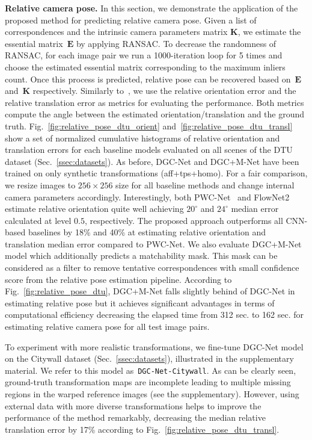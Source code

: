 \documentclass[10pt,twocolumn,letterpaper]{article}
\begin{document}
\noindent\textbf{Relative camera pose.} In this section, we demonstrate the application of the proposed method for predicting relative camera pose. Given a list of correspondences and the intrinsic camera parameters matrix $\mathbf{K}$, we estimate the essential matrix~$\mathbf{E}$ by applying RANSAC. To decrease the randomness of RANSAC, for each image pair we run a 1000-iteration loop for 5 times and choose the estimated essential matrix corresponding to the maximum inliers count. Once this process is predicted, relative pose can be recovered based on~$\mathbf{E}$ and~$\mathbf{K}$ respectively. Similarly to~\cite{RelativePoseCNN}, we use the relative orientation error and the relative translation error as metrics for evaluating  the performance. Both metrics compute the angle between the estimated orientation/translation and the ground truth. Fig.~\ref{fig:relative_pose_dtu_orient} and~\ref{fig:relative_pose_dtu_transl} show a set of normalized cumulative histograms of relative orientation and translation errors for each baseline models evaluated on all scenes of the DTU dataset (Sec.~\ref{ssec:datasets}). As before, DGC-Net and DGC+M-Net have been trained on only synthetic transformations (aff+tps+homo). For a fair comparison, we resize images to $256 \times 256$ size for all baseline methods and change internal camera parameters accordingly. Interestingly, both PWC-Net~\cite{PWC-Net} and FlowNet2~\cite{FlowNet2} estimate relative orientation quite well achieving $20^{\circ}$ and $24^{\circ}$ median error calculated at level $0.5$, respectively. The proposed approach outperforms all CNN-based baselines by 18\% and 40\% at estimating relative orientation and translation median error compared to PWC-Net. We also evaluate DGC+M-Net model which additionally predicts a matchability mask. This mask can be considered as a filter to remove tentative correspondences with small confidence score from the relative pose estimation pipeline. According to Fig.~\ref{fig:relative_pose_dtu}, DGC+M-Net falls slightly behind of DGC-Net in estimating relative pose but it achieves significant advantages in terms of computational efficiency decreasing the elapsed time from 312 sec. to 162 sec. for estimating relative camera pose for all test image pairs. 

To experiment with more realistic transformations, we fine-tune DGC-Net model on the Citywall dataset (Sec.~\ref{ssec:datasets}), illustrated in the supplementary material. We refer to this model as~\texttt{DGC-Net-Citywall}. As can be clearly seen, ground-truth transformation maps are incomplete leading to multiple missing regions in the warped reference images (see the supplementary). However, using external data with more diverse transformations helps to improve the performance of the method remarkably, decreasing the median relative translation error by 17\% according to Fig.~\ref{fig:relative_pose_dtu_transl}. 
\end{document}
